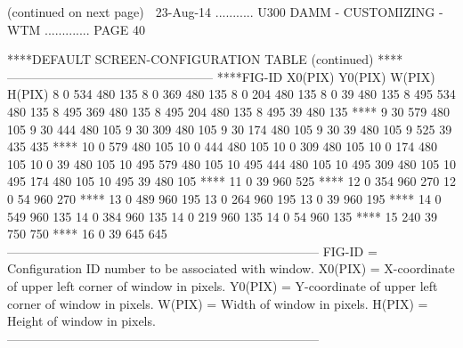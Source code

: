                     (continued on next page)
    
   23-Aug-14 ........... U300  DAMM - CUSTOMIZING - WTM ............. PAGE  40
 
   ****DEFAULT SCREEN-CONFIGURATION TABLE (continued)
   ****--------------------------------------------------
   ****FIG-ID   X0(PIX)   Y0(PIX)    W(PIX)    H(PIX)
            8         0       534       480       135
            8         0       369       480       135
            8         0       204       480       135
            8         0        39       480       135
            8       495       534       480       135
            8       495       369       480       135
            8       495       204       480       135
            8       495        39       480       135
   ****
            9        30       579       480       105
            9        30       444       480       105
            9        30       309       480       105
            9        30       174       480       105
            9        30        39       480       105
            9       525        39       435       435
   ****
           10         0       579       480       105
           10         0       444       480       105
           10         0       309       480       105
           10         0       174       480       105
           10         0        39       480       105
           10       495       579       480       105
           10       495       444       480       105
           10       495       309       480       105
           10       495       174       480       105
           10       495        39       480       105
   ****
           11         0        39       960       525
   ****
           12         0       354       960       270
           12         0        54       960       270
   ****
           13         0       489       960       195
           13         0       264       960       195
           13         0        39       960       195
   ****
           14         0       549       960       135
           14         0       384       960       135
           14         0       219       960       135
           14         0        54       960       135
   ****
           15       240        39       750       750
   ****
           16         0        39       645       645
   ---------------------------------------------------------------------------
   FIG-ID  = Configuration ID number to be associated with window.
   X0(PIX) = X-coordinate of upper left corner of window in pixels.
   Y0(PIX) = Y-coordinate of upper left corner of window in pixels.
   W(PIX)  = Width  of window in pixels.
   H(PIX)  = Height of window in pixels.
   ---------------------------------------------------------------------------
 
